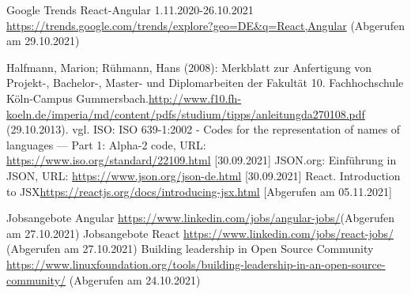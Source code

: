 \begin{thebibliography}{HR08}
Google Trends React-Angular 1.11.2020-26.10.2021 \url{https://trends.google.com/trends/explore?geo=DE&q=React,Angular} (Abgerufen am 29.10.2021)

 Halfmann, Marion; Rühmann, Hans (2008): Merkblatt zur Anfertigung von Projekt-, Bachelor-, Master- und Diplomarbeiten der Fakultät 10. Fachhochschule Köln-Campus Gummersbach.\url{http://www.f10.fh-koeln.de/imperia/md/content/pdfs/studium/tipps/anleitungda270108.pdf} (29.10.2013).
 vgl. ISO: ISO 639-1:2002 - Codes for the representation of names of languages — Part 1: Alpha-2 code, URL: \url{https://www.iso.org/standard/22109.html} [30.09.2021]
 JSON.org: Einführung in JSON, URL: \url{https://www.json.org/json-de.html} [30.09.2021]
React. Introduction to JSX\url{https://reactjs.org/docs/introducing-jsx.html} [Abgerufen am 05.11.2021]


 Jobsangebote Angular \url{https://www.linkedin.com/jobs/angular-jobs/}(Abgerufen am 27.10.2021)
 Jobsangebote React \url{https://www.linkedin.com/jobs/react-jobs/}  (Abgerufen am 27.10.2021)
Building leadership in Open Source Community \url{https://www.linuxfoundation.org/tools/building-leadership-in-an-open-source-community/} (Abgerufen am 24.10.2021)


\end{thebibliography}
